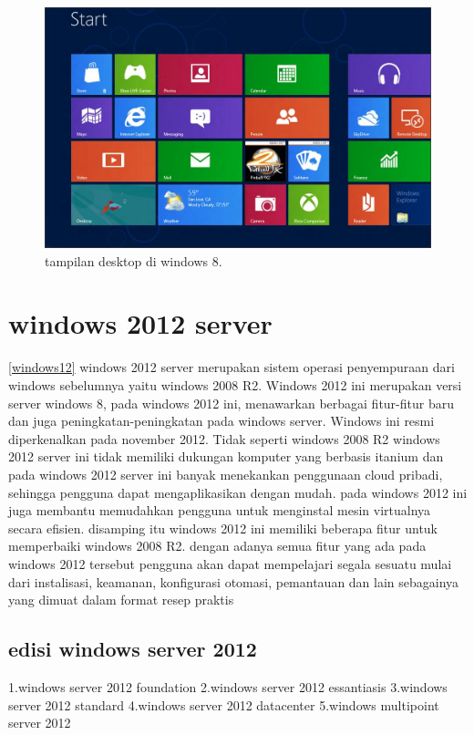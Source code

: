 \begin{figure}[ht]
\centerline{\includegraphics[width=1\textwidth]{figures/tampilanwindows8.JPG}}
\caption{tampilan desktop di windows 8.}
\label{tampilanwindows8}
\end{figure}


	\section{windows 2012 server}
		\ref{windows12} windows 2012 server merupakan sistem operasi penyempuraan dari windows sebelumnya yaitu windows 2008 R2. Windows 2012 ini merupakan versi server windows 8, pada windows 2012 ini, 
		menawarkan berbagai fitur-fitur baru dan juga peningkatan-peningkatan pada windows server. Windows ini resmi diperkenalkan pada november 2012. Tidak seperti windows 2008 R2 windows 
		2012 server ini tidak memiliki dukungan komputer yang berbasis itanium dan pada windows 2012 server ini banyak menekankan penggunaan cloud pribadi, sehingga pengguna dapat 
		mengaplikasikan dengan mudah. pada windows 2012 ini juga membantu memudahkan pengguna untuk menginstal mesin virtualnya secara efisien. disamping itu windows 2012 ini memiliki beberapa
		fitur untuk memperbaiki windows 2008 R2. dengan adanya semua fitur yang ada pada windows 2012 tersebut pengguna akan dapat mempelajari segala sesuatu mulai dari instalisasi, 
		keamanan, konfigurasi otomasi, pemantauan dan lain sebagainya yang dimuat dalam format resep praktis\cite{carvalho2012windows}
		\subsection{edisi windows server 2012}
			1.windows server 2012 foundation
			2.windows server 2012 essantiasis
			3.windows server 2012 standard
			4.windows server 2012 datacenter
			5.windows multipoint server 2012

